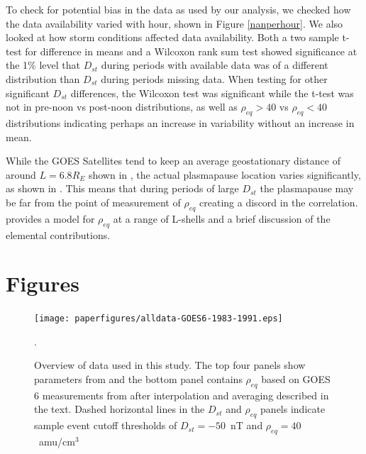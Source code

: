 \documentclass[10pt,twocolumn]{article}
\begin{document}
To check for potential bias in the data as used by our analysis, we checked how the data availability varied with hour, shown in Figure \ref{nanperhour}. We also looked at how storm conditions affected data availability. Both a two sample t-test for difference in means and a Wilcoxon rank sum test showed significance at the 1\% level that $D_{st}$ during periods with available data was of a different distribution than $D_{st}$ during periods missing data. When testing for other significant $D_{st}$ differences, the Wilcoxon test was significant while the t-test was not in pre-noon vs post-noon distributions, as well as $\rho_{eq}>40$ vs $\rho_{eq}<40$ distributions indicating perhaps an increase in variability without an increase in mean.

While the GOES Satellites tend to keep an average geostationary distance of around $L=6.8R_E$ shown in \cite{Takahashi2010}, the actual plasmapause location varies significantly, as shown in \cite{OBrien2003}. This means that during periods of large $D_{st}$ the plasmapause may be far from the point of measurement of $\rho_{eq}$ creating a discord in the correlation. \cite{Gallagher2000} provides a model for $\rho_{eq}$ at a range of L-shells and a brief discussion of the elemental contributions.

\newpage
\footnotesize



\clearpage
\section{Figures}

\begin{figure}[htp!]
\centering
\texttt{[image: paperfigures/alldata-GOES6-1983-1991.eps]}
\caption{Overview of data used in this study. The top four panels show parameters from \cite{Kondrashov2014ReconstructionOfGaps} and the bottom panel contains $\rho_{eq}$ based on GOES 6 measurements from \cite{Denton} after interpolation and averaging described in the text. Dashed horizontal lines in the $D_{st}$ and $\rho_{eq}$ panels indicate sample event cutoff thresholds of $D_{st} = -50$~nT and $\rho_{eq} = 40$~amu/cm$^3$}.
\label{AllData}
\end{figure}
\end{document}
